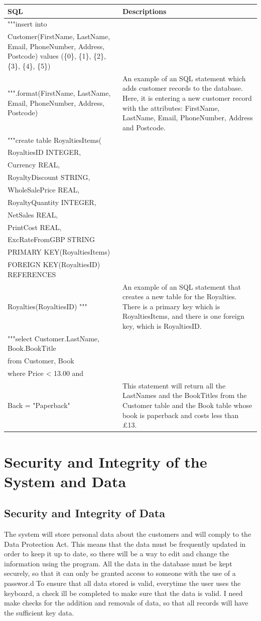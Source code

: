\begin{tabular}{|p{6cm}|p{5cm}|}
    \hline
    \textbf{SQL} & \textbf{Descriptions} \\ \hline 
     """insert into \\ Customer(FirstName, LastName, Email, PhoneNumber, Address, Postcode) values (\{0\}, \{1\}, \{2\}, \{3\}, \{4\}, \{5\}) \\ """.format(FirstName, LastName, Email, PhoneNumber, Address, Postcode) & An example of an SQL statement which adds customer records to the database. Here, it is entering a new customer record with the attributes: FirstName, LastName, Email, PhoneNumber, Address and Postcode. \\ \hline
    """create table RoyaltiesItems(\\ RoyaltiesID INTEGER, \\ Currency REAL, \\ RoyaltyDiscount STRING,\\  WholeSalePrice REAL,\\ RoyaltyQuantity INTEGER,\\ NetSales REAL,\\ PrintCost REAL, \\ ExcRateFromGBP STRING \\ PRIMARY KEY(RoyaltiesItems) \\ FOREIGN KEY(RoyaltiesID) REFERENCES \\ Royalties(RoyaltiesID) """ & An example of an SQL statement that creates a new table for the Royalties. There is a primary key which is RoyaltiesItems, and there is one foreign key, which is RoyaltiesID. \\ \hline 
    """select Customer.LastName, Book.BookTitle \\ from Customer, Book \\ where Price < 13.00 and \\ Back = "Paperback"  & This statement will return all the LastNames and the BookTitles from the Customer table and the Book table whose book is paperback and costs less than £13. \\ \hline
\end{tabular}

\section{Security and Integrity of the System and Data}

\subsection{Security and Integrity of Data}
The system will store personal data about the customers and will comply to the Data Protection Act. This means that the data must be frequently updated in order to keep it up to date, so there will be a way to edit and change the information using the program. All the data in the database must be kept securely, so that it can only be granted access to someone with the use of a passwor.d To ensure that all data stored is valid, everytime the user uses the keyboard, a check ill be completed to make sure that the data is valid. I need make checks for the addition and removals of data, so that all records will have the sufficient key data.

